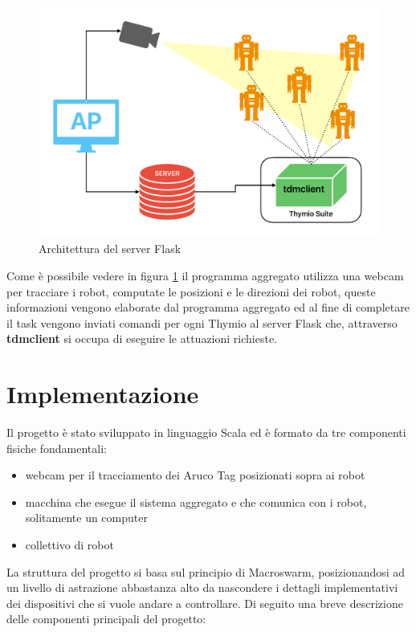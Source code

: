 \documentclass[12pt,a4paper,openright,twoside]{book}
\begin{document}
\begin{figure}
    \centering
    \includegraphics[width=.8\linewidth]{figures/server-arc.pdf}
    \caption{Architettura del server Flask}
    \label{fig:server-arc}
\end{figure}

Come è possibile vedere in figura \cref{fig:server-arc} il programma aggregato utilizza una webcam per tracciare i robot, computate le posizioni e le direzioni dei robot, queste informazioni vengono elaborate dal programma aggregato ed al fine di completare il task vengono inviati comandi per ogni Thymio al server Flask che, attraverso \textbf{tdmclient} si occupa di eseguire le attuazioni richieste. 

\chapter{Implementazione}
\label{chap:implementazione}

Il progetto è stato sviluppato in linguaggio Scala ed è formato da tre componenti fisiche fondamentali:
\begin{itemize}
    \item webcam per il tracciamento dei Aruco Tag posizionati sopra ai robot
    \item macchina che esegue il sistema aggregato e che comunica con i robot, solitamente un computer
    \item collettivo di robot
\end{itemize}

La struttura del progetto si basa sul principio di Macroswarm, posizionandosi ad un livello di astrazione abbastanza alto da nascondere i dettagli implementativi dei dispositivi che si vuole andare a controllare. Di seguito una breve descrizione delle componenti principali del progetto:
\end{document}
